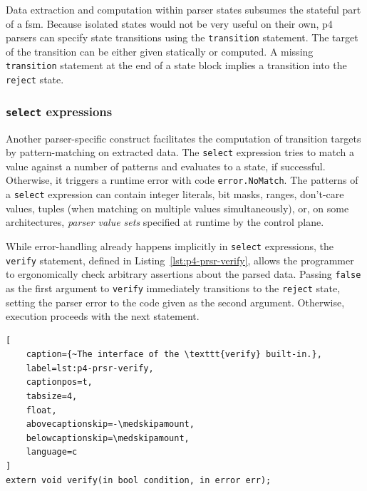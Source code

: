 Data extraction and computation within parser states subsumes the stateful part
of a \acrlong{fsm}. Because isolated states would not be very useful on their
own, \acrshort{p4} parsers can specify state transitions using the
\texttt{transition} statement. The target of the transition can be either given
statically or computed. A missing \texttt{transition} statement at the end of a
state block implies a transition into the \texttt{reject} state.

\subsubsection*{\texttt{select} expressions}

Another parser-specific construct facilitates the computation of transition
targets by pattern-matching on extracted data. The \texttt{select} expression
tries to match a value against a number of patterns and evaluates to a state, if
successful. Otherwise, it triggers a runtime error with code
\texttt{error.NoMatch}.
The patterns of a \texttt{select} expression can contain integer literals, bit
masks, ranges, don't-care values, tuples (when matching on multiple values
simultaneously), or, on some architectures, \textit{parser value sets} specified
at runtime by the control plane.

While error-handling already happens implicitly in \texttt{select} expressions,
the \texttt{verify} statement, defined in Listing~\ref{lst:p4-prsr-verify},
allows the programmer to ergonomically check arbitrary assertions about the
parsed data. Passing \texttt{false} as the first argument to \texttt{verify}
immediately transitions to the \texttt{reject} state, setting the parser error
to the code given as the second argument. Otherwise, execution proceeds with the
next statement.

\begin{lstlisting}[
	caption={~The interface of the \texttt{verify} built-in.},
	label=lst:p4-prsr-verify,
	captionpos=t,
	tabsize=4,
	float,
	abovecaptionskip=-\medskipamount,
	belowcaptionskip=\medskipamount,
	language=c
]
extern void verify(in bool condition, in error err);
\end{lstlisting}


